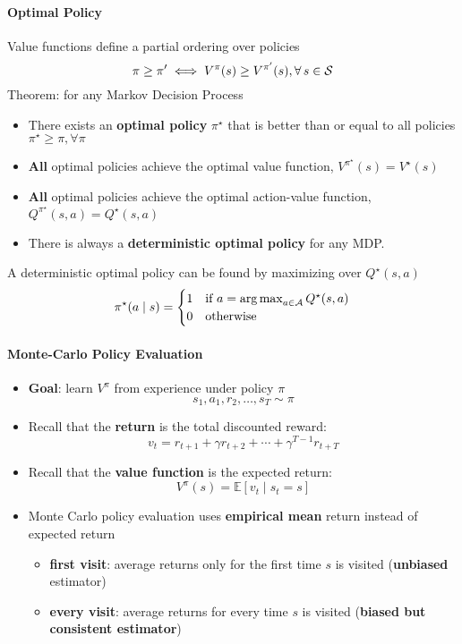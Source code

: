 \paragraph{Optimal Policy} Value functions define a partial ordering over policies
\[
    \pi \geq \pi ' \iff V^{\pi }(s)\geq V^{\pi'}(s), \forall s\in \Sc
\]
Theorem: for any Markov Decision Process
\begin{itemize}
    \item There exists an \textbf{optimal policy} $\pi ^{\star} $ that is better than or equal to all policies $\pi ^{\star}\geq \pi ,\forall \pi  $
    \item \textbf{All} optimal policies achieve the optimal value function, $V^{\pi ^{\star} }(s) = V^{\star}(s)$
    \item \textbf{All} optimal policies achieve the optimal action-value function, $Q^{\pi ^{\star} }(s,a) = Q^{\star}(s,a)$
    \item There is always a \textbf{deterministic optimal policy} for any MDP.
\end{itemize}
A deterministic optimal policy can be found by maximizing over $Q^{\star}(s,a) $
\[
    \pi ^{\star}(a\mid s) = \begin{cases}
        1 & \text{if } a = \operatorname*{arg\,max}_{a\in \mathcal{A}} Q^{\star}(s,a) \\
        0 & \text{otherwise}
    \end{cases} 
\]

\paragraph{Monte-Carlo Policy Evaluation}
\begin{itemize}
    \item \textbf{Goal}: learn $V^{\pi}$ from experience under policy $\pi$
    \[
    s_{1}, a_{1}, r_{2}, \ldots, s_{T} \sim \pi
    \]
    \item Recall that the \textbf{return} is the total discounted reward:
    \[
    v_{t}=r_{t+1}+\gamma r_{t+2}+\cdots+\gamma^{T-1} r_{t+T}
    \]
    \item Recall that the \textbf{value function} is the expected return:
    \[
    V^{\pi}(s)=\mathbb{E}\left[v_{t} \mid s_{t}=s\right]
    \]
    \item Monte Carlo policy evaluation uses \textbf{empirical mean} return instead of expected return
    \begin{itemize}
        \item \textbf{first visit}: average returns only for the first time $s$ is visited (\textbf{unbiased} estimator)
        \item \textbf{every visit}: average returns for every time $s$ is visited (\textbf{biased but consistent estimator})
    \end{itemize}
\end{itemize}

